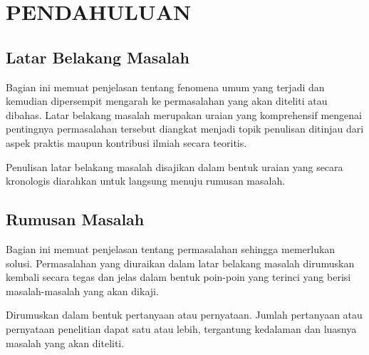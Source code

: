 \chapter{PENDAHULUAN}

\section{Latar Belakang Masalah}
\begin{isi}
Bagian ini memuat penjelasan tentang fenomena umum yang terjadi
dan kemudian dipersempit mengarah ke permasalahan yang akan
diteliti atau dibahas. Latar belakang masalah merupakan uraian
yang komprehensif mengenai pentingnya permasalahan tersebut
diangkat menjadi topik penulisan ditinjau dari aspek praktis
maupun kontribusi ilmiah secara teoritis.

Penulisan latar belakang masalah disajikan dalam bentuk uraian
yang secara kronologis diarahkan untuk langsung menuju rumusan
masalah.
\end{isi}

\section{Rumusan Masalah}
\begin{isi}
Bagian ini memuat penjelasan tentang permasalahan sehingga
memerlukan solusi. Permasalahan yang diuraikan dalam latar
belakang masalah dirumuskan kembali secara tegas dan jelas dalam
bentuk poin-poin yang terinci yang berisi masalah-masalah yang
akan dikaji.

Dirumuskan dalam bentuk pertanyaan atau pernyataan. Jumlah
pertanyaan atau pernyataan penelitian dapat satu atau lebih,
tergantung kedalaman dan luasnya masalah yang akan diteliti.
\end{isi}


